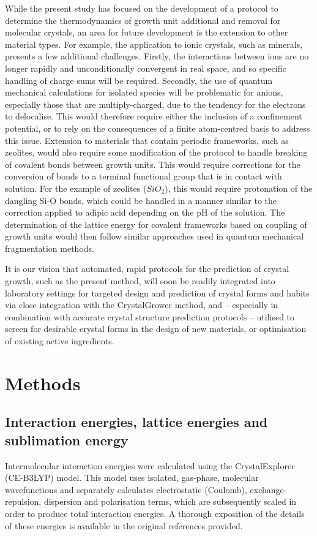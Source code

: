 \documentclass[twoside,twocolumn,9pt]{article}
\begin{document}
While the present study has focused on the development of a protocol to determine the thermodynamics of growth unit additional and removal for molecular crystals, an area for future development is the extension to other material types. For example, the application to ionic crystals, such as minerals, presents a few additional challenges. Firstly, the interactions between ions are no longer rapidly and unconditionally convergent in real space, and so specific handling of charge sums will be required. Secondly, the use of quantum mechanical calculations for isolated species will be problematic for anions, especially those that are multiply-charged, due to the tendency for the electrons to delocalise. This would therefore require either the inclusion of a confinement potential, or to rely on the consequences of a finite atom-centred basis to address this issue. Extension to materials that contain periodic frameworks, such as zeolites, would also require some modification of the protocol to handle breaking of covalent bonds between growth units. This would require corrections for the conversion of bonds to a terminal functional group that is in contact with solution. For the example of zeolites ($SiO_{2}$), this would require protonation of the dangling Si-O bonds, which could be handled in a manner similar to the correction applied to adipic acid depending on the pH of the solution. The determination of the lattice energy for covalent frameworks based on coupling of growth units would then follow similar approaches used in quantum mechanical fragmentation methods.\cite{Gordon2012,Wang2014}

It is our vision that automated, rapid protocols for the prediction of crystal growth, such as the present method, will soon be readily integrated into laboratory settings for targeted design and prediction of crystal forms and habits via close integration with the CrystalGrower method, and -- especially in combination with accurate crystal structure prediction protocols -- utilised to screen for desirable crystal forms in the design of new materials, or optimisation of existing active ingredients.

\section{Methods}

\subsection{Interaction energies, lattice energies and sublimation energy}
Intermolecular interaction energies were calculated using the CrystalExplorer (CE-B3LYP) model.\cite{Mackenzie2017,Turner2014} 
This model uses isolated, gas-phase, molecular wavefunctions and separately calculates electrostatic (Coulomb), exchange-repulsion, dispersion and polarisation terms, which are subsequently scaled in order to produce total interaction energies. A thorough exposition of the details of these energies is available in the original references provided.
\end{document}
